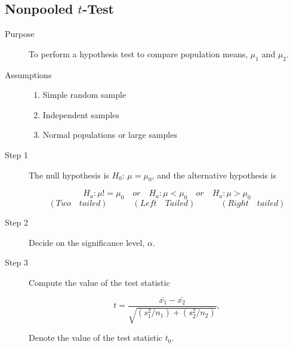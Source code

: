 \documentclass[12pt]{article}
\begin{document}
        \subsection*{Nonpooled $t$-Test}
            \begin{description}
                \item[Purpose] To perform a hypothesis test to compare population means,
                $\mu_1$ and $\mu_2$.
                \item[Assumptions] 
                \begin{enumerate}
                    \item Simple random sample
                    \item Independent samples 
                    \item Normal populations or large samples
                \end{enumerate}
                \item[Step 1] The null hypothesis is $H_0$: $\mu = \mu_0$, and the alternative
                hypothesis is
                \begin{center}
                    \[
                        H_a: \mu != \mu_0 \quad or \quad H_a: \mu < \mu_0 \quad or \quad 
                        H_a: \mu > \mu_0    
                    \]
                    \[
                        (Two \quad tailed)\quad\quad\quad(Left \quad Tailed)\quad\quad\quad
                        (Right \quad tailed)    
                    \]                    
                \end{center}
                \item[Step 2] Decide on the significance level, $\alpha$.
                \item[Step 3] Compute the value of the test statistic
                \begin{center}
                    \[
                        t = \frac{\bar{x_1}-\bar{x_2}}{\sqrt{(s_1^2/n_1)+(s_2^2/n_2)}},
                    \]
                \end{center} 
                Denote the value of the test statistic $t_0$. 
            \end{description}
\end{document}
